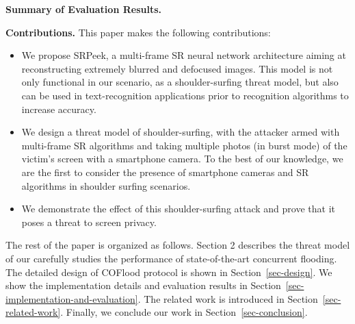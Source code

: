 
\vspace{1mm}
\noindent
\textbf{Summary of Evaluation Results.}


\vspace{1mm}
\noindent
\textbf{Contributions.} This paper makes the following contributions:
\begin{itemize}[leftmargin=*]
  \item	We propose \textsf{SRPeek}, a multi-frame SR neural network architecture aiming at reconstructing extremely blurred and defocused images. This model is not only functional in our scenario, as a shoulder-surfing threat model, but also can be used in text-recognition applications prior to recognition algorithms to increase accuracy.
  \item	We design a threat model of shoulder-surfing, with the attacker armed with multi-frame SR algorithms and taking multiple photos (in burst mode) of the victim’s screen with a smartphone camera. To the best of our knowledge, we are the first to consider the presence of smartphone cameras and SR algorithms in shoulder surfing scenarios.
  \item	We demonstrate the effect of this shoulder-surfing attack and prove that it poses a threat to screen privacy.
\end{itemize}

The rest of the paper is organized as follows. Section 2 describes the threat model of our  carefully studies the performance of state-of-the-art concurrent flooding. The detailed design of COFlood protocol is shown in Section~\ref{sec-design}. We show the implementation details and evaluation results in Section~\ref{sec-implementation-and-evaluation}. The related work is introduced in Section~\ref{sec-related-work}. Finally, we conclude our work in Section~\ref{sec-conclusion}.
